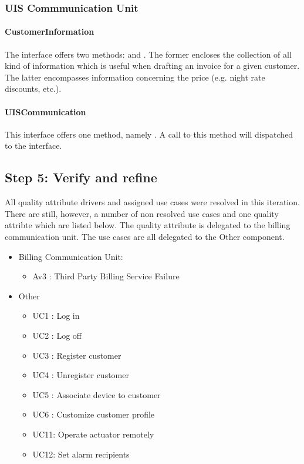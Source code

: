 \subsubsection{UIS Commmunication Unit}

\paragraph{CustomerInformation}

\npar The  interface offers two methods:
 and
. The former encloses the collection of all
kind of information which is useful when drafting an invoice for a given
customer. The latter encompasses information concerning the price (e.g.
night rate discounts, etc.).

\paragraph{UISCommunication}
\npar This interface offers one method, namely
. A call to this method will
dispatched to the  interface.

\subsection{Step 5: Verify and refine}
\label{add:it8/verification}

\npar All quality attribute drivers and assigned use cases were resolved in
this iteration. There are still, however, a number of non resolved use cases and
one quality attribte which are listed below. The quality attribute is
delegated to the billing communication unit. The use cases are all delegated to
the Other component.

\begin{itemize}
  \item Billing Communication Unit:
  \begin{itemize}
    \item Av3 : Third Party Billing Service Failure
  \end{itemize}
  \item Other
  \begin{itemize}
  	\item UC1 : Log in
  	\item UC2 : Log off
  	\item UC3 : Register customer
  	\item UC4 : Unregister customer
  	\item UC5 : Associate device to customer
  	\item UC6 : Customize customer profile
 	\item UC11: Operate actuator remotely
  	\item UC12: Set alarm recipients
  \end{itemize}
\end{itemize}
